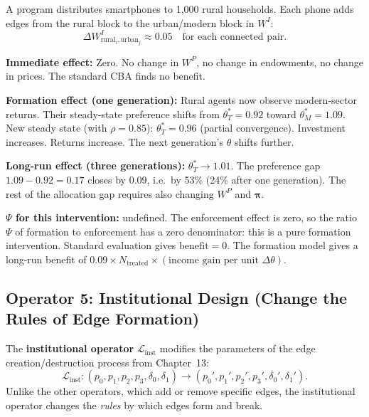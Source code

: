\documentclass[../structural_economics_book.tex]{subfiles}
\begin{document}
\begin{example}\label{ch15:ex:smartphone}
A program distributes smartphones to 1,000 rural households. Each phone adds edges from the rural block to the urban/modern block in $W^I$:
\begin{equation}
\Delta W^I_{\text{rural}_i, \text{urban}_j} \approx 0.05 \quad \text{for each connected pair}.
\end{equation}

\textbf{Immediate effect:} Zero. No change in $W^P$, no change in endowments, no change in prices. The standard CBA finds no benefit.

\textbf{Formation effect (one generation):} Rural agents now observe modern-sector returns. Their steady-state preference shifts from $\theta^*_T = 0.92$ toward $\theta^*_M = 1.09$. New steady state (with $\rho = 0.85$): $\theta^*_T = 0.96$ (partial convergence). Investment increases. Returns increase. The next generation's $\theta$ shifts further.

\textbf{Long-run effect (three generations):} $\theta^*_T \to 1.01$. The preference gap $1.09 - 0.92 = 0.17$ closes by $0.09$, i.e.\ by 53\% (24\% after one generation). The rest of the allocation gap requires also changing $W^P$ and $\boldsymbol{\pi}$.

\textbf{$\Psi$ for this intervention:} undefined. The enforcement effect is zero, so the ratio $\Psi$ of formation to enforcement has a zero denominator: this is a pure formation intervention. Standard evaluation gives $\text{benefit} = 0$. The formation model gives a long-run benefit of $0.09 \times N_{\text{treated}} \times (\text{income gain per unit } \Delta\theta)$.
\end{example}


\subsection{Operator 5: Institutional Design (Change the Rules of Edge Formation)}

\begin{definition}\label{ch15:def:institutional}
The \textbf{institutional operator} $\mathcal{L}_{\text{inst}}$ modifies the parameters of the edge creation/destruction process from Chapter~13:
\begin{equation}\label{ch15:eq:institutional}
\mathcal{L}_{\text{inst}}: (p_0, p_1, p_2, p_3, \delta_0, \delta_1) \to (p_0', p_1', p_2', p_3', \delta_0', \delta_1').
\end{equation}
Unlike the other operators, which add or remove specific edges, the institutional operator changes the \textit{rules} by which edges form and break.
\end{definition}
\end{document}
